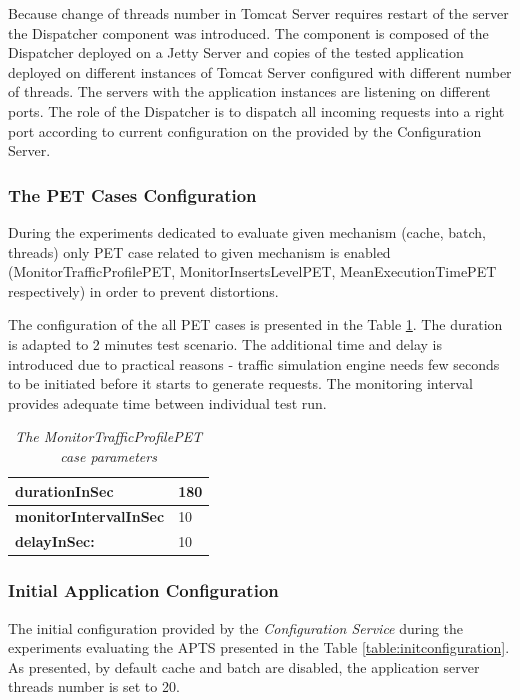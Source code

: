 \documentclass[12pt,a4paper]{article}
\begin{document}
Because change of threads number in Tomcat Server requires restart of the server the Dispatcher component was introduced. The component is composed of the Dispatcher deployed on a Jetty Server and copies of the tested application deployed on different instances of Tomcat Server configured with different number of threads. The servers with the application instances are listening on different ports. The role of the Dispatcher is to dispatch all incoming requests into a right port according to current configuration on the provided by the Configuration Server.


\subsubsection{The PET Cases Configuration}

During the experiments dedicated to evaluate given mechanism (cache, batch, threads) only PET case related to given mechanism is enabled (MonitorTrafficProfilePET, MonitorInsertsLevelPET, MeanExecutionTimePET respectively) in order to prevent distortions. 

The configuration of the all PET cases is presented in the Table \ref{evaluationtestconf}. The duration is adapted to 2 minutes test scenario. The additional time and delay is introduced due to practical reasons - traffic simulation engine needs few seconds to be initiated before it starts to generate requests. The monitoring interval provides adequate time between individual test run.

\begin{table}[!htb]
\def\arraystretch{1.5}
\caption{\textit{The MonitorTrafficProfilePET case parameters}} \label{evaluationtestconf}
\begin{tabularx}{\textwidth}{X|X}

\textbf{durationInSec} & 180 \\ \hline
\textbf{monitorIntervalInSec} & 10 \\ \hline
\textbf{delayInSec:} & 10\\
\end{tabularx}
\end{table}


\subsubsection{Initial Application Configuration}

The initial configuration provided by the \textit{Configuration Service} during the experiments evaluating the APTS presented in the Table \ref{table:initconfiguration}. As presented, by default cache and batch are disabled, the application server threads number is set to 20. 
\end{document}
